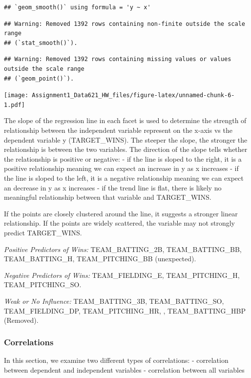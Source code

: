\documentclass[
]{article}
\begin{document}
\begin{verbatim}
## `geom_smooth()` using formula = 'y ~ x'
\end{verbatim}

\begin{verbatim}
## Warning: Removed 1392 rows containing non-finite outside the scale range
## (`stat_smooth()`).
\end{verbatim}

\begin{verbatim}
## Warning: Removed 1392 rows containing missing values or values outside the scale range
## (`geom_point()`).
\end{verbatim}

\texttt{[image: Assignment1\_Data621\_HW\_files/figure-latex/unnamed-chunk-6-1.pdf]}

The slope of the regression line in each facet is used to determine the
strength of relationship between the independent variable represent on
the x-axis vs the dependent variable y (TARGET\_WINS). The steeper the
slope, the stronger the relationship is between the two variables. The
direction of the slope tells whether the relationship is positive or
negative: - if the line is sloped to the right, it is a positive
relationship meaning we can expect an increase in y as x increases - if
the line is sloped to the left, it is a negative relationship meaning we
can expect an decrease in y as x increases - if the trend line is flat,
there is likely no meaningful relationship between that variable and
TARGET\_WINS.

If the points are closely clustered around the line, it suggests a
stronger linear relationship. If the points are widely scattered, the
variable may not strongly predict TARGET\_WINS.

\emph{Positive Predictors of Wins:} TEAM\_BATTING\_2B,
TEAM\_BATTING\_BB, TEAM\_BATTING\_H, TEAM\_PITCHING\_BB (unexpected).

\emph{Negative Predictors of Wins:} TEAM\_FIELDING\_E,
TEAM\_PITCHING\_H, TEAM\_PITCHING\_SO.

\emph{Weak or No Influence:} TEAM\_BATTING\_3B, TEAM\_BATTING\_SO,
TEAM\_FIELDING\_DP, TEAM\_PITCHING\_HR, , TEAM\_BATTING\_HBP (Removed).

\subsubsection{Correlations}\label{correlations}

In this section, we examine two different types of correlations: -
correlation between dependent and independent variables - correlation
between all variables
\end{document}
